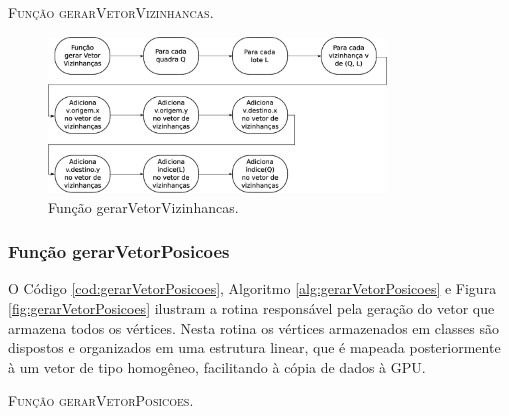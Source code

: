

\begin{algorithm}[H]
   \SetAlgoLined   
   
   \caption{\textsc{Função gerarVetorVizinhancas.}}
   \label{alg:gerarVetorVizinhancas}
\end{algorithm}

\begin{figure}[H]
  \centering
  \includegraphics[width=0.8\textwidth]{Figuras/Simula/Fluxos/gerarVetorVizinhancas.eps}
  \caption{Função gerarVetorVizinhancas.}
  \label{fig:gerarVetorVizinhancas}
\end{figure} 

\newpage

\subsubsection{Função gerarVetorPosicoes}

O Código \ref{cod:gerarVetorPosicoes}, Algoritmo \ref{alg:gerarVetorPosicoes} e Figura \ref{fig:gerarVetorPosicoes} ilustram a rotina responsável pela geração do vetor que armazena todos os vértices. Nesta rotina os vértices armazenados em classes são dispostos e organizados em uma estrutura linear, que é mapeada posteriormente à um vetor de tipo homogêneo, facilitando à cópia de dados à GPU.



\begin{algorithm}[H]
   \SetAlgoLined   
   
   \caption{\textsc{Função gerarVetorPosicoes.}}
   \label{alg:gerarVetorPosicoes}
\end{algorithm}

